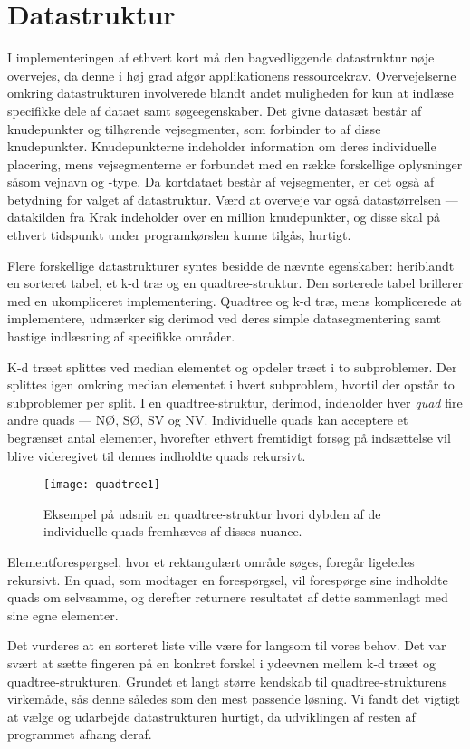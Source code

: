 \section{Datastruktur}
\label{sec:datastruktur}
I implementeringen af ethvert kort må den bagvedliggende datastruktur nøje overvejes, da denne i høj grad afgør applikationens ressourcekrav. Overvejelserne omkring datastrukturen involverede blandt andet muligheden for kun at indlæse specifikke dele af dataet samt søgeegenskaber. Det givne datasæt består af knudepunkter og tilhørende vejsegmenter, som forbinder to af disse knudepunkter. Knudepunkterne indeholder information om deres individuelle placering, mens vejsegmenterne er forbundet med en række forskellige oplysninger såsom vejnavn og -type. Da kortdataet består af vejsegmenter, er det også af betydning for valget af datastruktur. Værd at overveje var også datastørrelsen --- datakilden fra Krak indeholder over en million knudepunkter, og disse skal på ethvert tidspunkt under programkørslen kunne tilgås, hurtigt.

Flere forskellige datastrukturer syntes besidde de nævnte egenskaber: heriblandt en sorteret tabel, et k-d træ og en quadtree-struktur. Den sorterede tabel brillerer med en ukompliceret implementering. Quadtree og k-d træ, mens komplicerede at implementere, udmærker sig derimod ved deres simple datasegmentering samt hastige indlæsning af specifikke områder.

K-d træet splittes ved median elementet og opdeler træet i to subproblemer. Der splittes igen omkring median elementet i hvert subproblem, hvortil der opstår to subproblemer per split. I en quadtree-struktur, derimod, indeholder hver \emph{quad} fire andre quads --- NØ, SØ, SV og NV. Individuelle quads kan acceptere et begrænset antal elementer, hvorefter ethvert fremtidigt forsøg på indsættelse vil blive videregivet til dennes indholdte quads rekursivt.
\begin{figure}[ht]
	\centering
	\texttt{[image: quadtree1]}
	\captionsetup{width=0.8\textwidth}
	\caption{Eksempel på udsnit en quadtree-struktur hvori dybden af de individuelle quads fremhæves af disses nuance.}
	\label{fig:quadtree1}
\end{figure}
Elementforespørgsel, hvor et rektangulært område søges, foregår ligeledes rekursivt. En quad, som modtager en forespørgsel, vil forespørge sine indholdte quads om selvsamme, og derefter returnere resultatet af dette sammenlagt med sine egne elementer.

Det vurderes at en sorteret liste ville være for langsom til vores behov. Det var svært at sætte fingeren på en konkret forskel i ydeevnen mellem k-d træet og quadtree-strukturen. Grundet et langt større kendskab til quadtree-strukturens virkemåde, sås denne således som den mest passende løsning. Vi fandt det vigtigt at vælge og udarbejde datastrukturen hurtigt, da udviklingen af resten af programmet afhang deraf.

